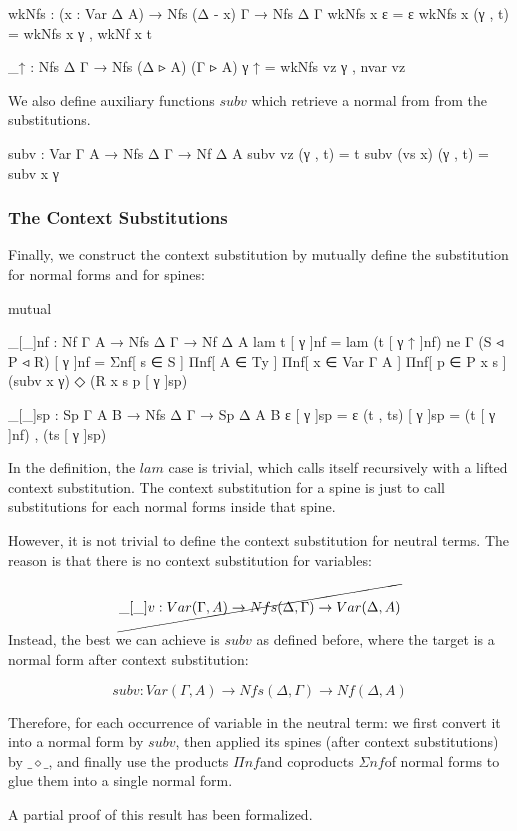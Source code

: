 \begin{code}[hide]
wkNfs : (x : Var Δ A) → Nfs (Δ - x) Γ → Nfs Δ Γ
wkNfs x ε = ε
wkNfs x (γ , t) = wkNfs x γ , wkNf x t

_↑ : Nfs Δ Γ → Nfs (Δ ▹ A) (Γ ▹ A)
γ ↑ = wkNfs vz γ , nvar vz
\end{code}

We also define auxiliary functions $subv$ which retrieve a normal from from the substitutions.

\begin{code}
subv : Var Γ A → Nfs Δ Γ → Nf Δ A
subv vz (γ , t) = t
subv (vs x) (γ , t) = subv x γ
\end{code}

\subsubsection*{The Context Substitutions}

Finally, we construct the context substitution by mutually define the substitution for normal forms and for spines:

\begin{code}[hide]
mutual
\end{code}

\begin{code}
  _[_]nf : Nf Γ A → Nfs Δ Γ → Nf Δ A
  lam t [ γ ]nf = lam (t [ γ ↑ ]nf)
  ne {Γ} (S ◃ P ◃ R) [ γ ]nf = Σnf[ s ∈ S ]
    Πnf[ A ∈ Ty ] Πnf[ x ∈ Var Γ A ] Πnf[ p ∈ P x s ]
    (subv x γ) ◇ (R x s p [ γ ]sp)

  _[_]sp : Sp Γ A B → Nfs Δ Γ → Sp Δ A B
  ε [ γ ]sp = ε
  (t , ts) [ γ ]sp = (t [ γ ]nf) , (ts [ γ ]sp)
\end{code}

In the definition, the $lam$ case is trivial, which calls itself recursively with a lifted context substitution. The context substitution for a spine is just to call substitutions for each normal forms inside that spine.

However, it is not trivial to define the context substitution for neutral terms. The reason is that there is no context substitution for variables:

\[ \cancel{\_[\_]v : Var (\Gamma, A) \to Nfs(\Delta, \Gamma) \to Var (\Delta, A)} \]

Instead, the best we can achieve is $subv$ as defined before, where the target is a normal form after context substitution:

\[ subv : Var (\Gamma, A) \to Nfs(\Delta, \Gamma) \to Nf (\Delta, A) \]

Therefore, for each occurrence of variable in the neutral term: we first convert it into a normal form by $subv$, then applied its spines (after context substitutions) by $\_\diamond\_$, and finally use the products $\Pi nf$and coproducts $\Sigma nf$of normal forms to glue them into a single normal form.

A partial proof of this result has been formalized. \hyperref[SCwF]{\faCog}